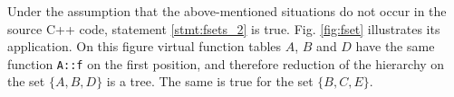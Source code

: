 \documentclass[times, 10pt,twocolumn]{article}
\begin{document}
Under the assumption that the above-mentioned situations
do not occur in the source C++ code, statement \ref{stmt:fsets_2} is true.
Fig. \ref{fig:fset} illustrates its application.
On this figure virtual function tables $A$, $B$ and $D$ have
the same function \lstinline{A::f} on the first position,
and therefore reduction of the hierarchy on the set $\{A, B, D\}$ is a tree.
The same is true for the set $\{B, C, E\}$.

\begin{figure}[htb!]
\centering
  \begin{center}

\end{center}
\end{figure}
\end{document}
